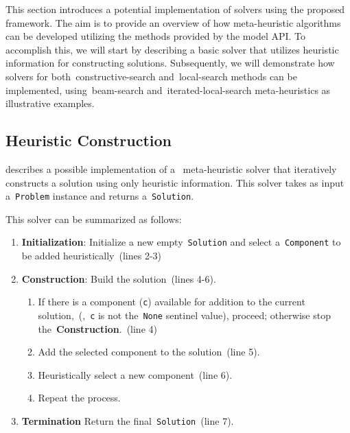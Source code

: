 This section introduces a potential implementation of solvers using the proposed
framework. The aim is to provide an overview of how meta-heuristic algorithms
can be developed utilizing the methods provided by the model API. To accomplish
this, we will start by describing a basic solver that utilizes heuristic
information for constructing solutions. Subsequently, we will demonstrate how
solvers for both~\acrshort{constructive-search} and~\acrshort{local-search}
methods can be implemented, using~\acrshort{beam-search}
and~\acrshort{iterated-local-search} meta-heuristics as illustrative examples.

\subsection{Heuristic Construction}
\label{subsec:heuristic-construction}

 describes a possible implementation of a
~\acrshort{meta-heuristic} solver that iteratively constructs a solution using
only heuristic information. This solver takes as input a~\texttt{Problem}
instance and returns a~\texttt{Solution}.



This solver can be summarized as follows:

\begin{enumerate}
      \item \textbf{Initialization}: Initialize a new empty~\texttt{Solution} and
            select a~\texttt{Component} to be added heuristically~(lines 2-3)
      \item \textbf{Construction}: Build the solution~(lines 4-6).
            \begin{enumerate}
                  \item If there is a component (\texttt{c}) available for addition to the
                        current solution,~(\ie{},~\texttt{c} is not the~\texttt{None}
                        sentinel value), proceed; otherwise stop the~\textbf{Construction}.~(line 4)
                  \item Add the selected component to the solution~(line 5).
                  \item Heuristically select a new component~(line 6).
                  \item Repeat the process.
            \end{enumerate}
      \item \textbf{Termination} Return the final~\texttt{Solution}~(line 7).
\end{enumerate}

